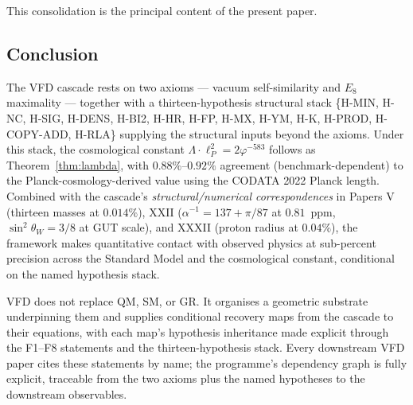 \documentclass[12pt]{article}
\theoremstyle{definition}
\theoremstyle{remark}
\begin{document}
This consolidation is the principal content of the present paper.

\subsection{Conclusion}

The VFD cascade rests on two axioms --- vacuum self-similarity and $E_8$ maximality --- together with a thirteen-hypothesis structural stack \{H-MIN, H-NC, H-SIG, H-DENS, H-BI2, H-HR, H-FP, H-MX, H-YM, H-K, H-PROD, H-COPY-ADD, H-RLA\} supplying the structural inputs beyond the axioms. Under this stack, the cosmological constant $\Lambda \cdot \ell_P^2 = 2 \varphi^{-583}$ follows as Theorem~\ref{thm:lambda}, with $0.88\%$--$0.92\%$ agreement (benchmark-dependent) to the Planck-cosmology-derived value using the CODATA 2022 Planck length. Combined with the cascade's \emph{structural/numerical correspondences} in Papers V (thirteen masses at $0.014\%$), XXII ($\alpha^{-1} = 137 + \pi/87$ at $0.81$~ppm, $\sin^2\theta_W = 3/8$ at GUT scale), and XXXII (proton radius at $0.04\%$), the framework makes quantitative contact with observed physics at sub-percent precision across the Standard Model and the cosmological constant, conditional on the named hypothesis stack.

VFD does not replace QM, SM, or GR. It organises a geometric substrate underpinning them and supplies conditional recovery maps from the cascade to their equations, with each map's hypothesis inheritance made explicit through the F1--F8 statements and the thirteen-hypothesis stack. Every downstream VFD paper cites these statements by name; the programme's dependency graph is fully explicit, traceable from the two axioms plus the named hypotheses to the downstream observables.
\end{document}
